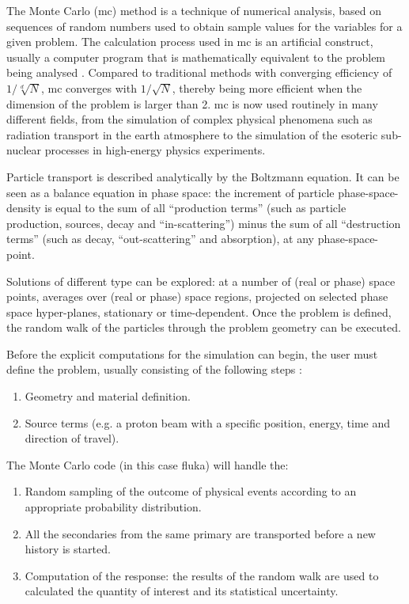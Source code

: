 \documentclass[encoding=utf8,british]{tumphthesis}
\begin{document}
The Monte Carlo (\acrshort{mc}) method is a technique of numerical analysis, based on sequences of random numbers used to obtain sample values for the variables for a given problem. The calculation process used in \acrshort{mc} is an artificial construct, usually a computer program that is mathematically equivalent to the problem being analysed \cite{Dupree:1100826}. Compared to traditional methods with converging efficiency of $1/\sqrt[d]{N}$, \acrshort{mc} converges with $1/\sqrt{N}$, thereby being more efficient when the dimension of the problem is larger than 2. \acrshort{mc} is now used routinely in many different fields, from the simulation of complex physical phenomena such as radiation transport in the earth atmosphere to the simulation of the esoteric sub-nuclear processes in high-energy physics experiments.

Particle transport is described analytically by the Boltzmann equation. It can be seen as a balance equation in phase space: the increment of particle phase-space-density is equal to the sum of all “production terms” (such as particle production, sources, decay and  “in-scattering”) minus the sum of all “destruction terms” (such as decay,  “out-scattering” and absorption), at any phase-space-point. 


Solutions of different type can be explored: at a number of (real or phase) space points, averages over (real or phase) space regions, projected on selected phase
space hyper-planes, stationary or time-dependent. Once the problem is defined, the random walk of the particles through the problem geometry can be
executed.

Before the explicit computations for the simulation can begin, the user must define the problem, usually consisting of the following steps \cite{Dupree:1100826}:
\begin{enumerate}
    \item Geometry and material definition.
    \item Source terms (e.g. a proton beam with a specific position, energy, time and direction of travel).
\end{enumerate}

The Monte Carlo code (in this case \acrshort{fluka}) will handle the:
\begin{enumerate}
    \item Random sampling of the outcome of physical events according to an appropriate probability distribution.
    \item All the secondaries from the same primary are transported before a new history is started.
    \item Computation of the response: the results of the random walk are used to calculated the quantity of interest and its statistical uncertainty.
\end{enumerate}
\end{document}
